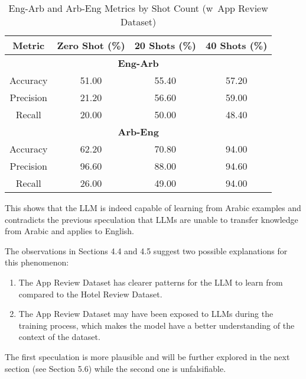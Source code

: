 \documentclass[sigconf, nonacm]{acmart}
\theoremstyle{definition}
\begin{document}
\begin{table}[h!]
  \centering
  \caption{Eng-Arb and Arb-Eng Metrics by Shot Count (w\ App Review Dataset)}
  \begin{tabular}{c c c c}
    \toprule
    \textbf{Metric} & \textbf{Zero Shot (\%)} & \textbf{20 Shots (\%)} & \textbf{40 Shots (\%)} \\
    \midrule
    \multicolumn{4}{c}{\textbf{Eng-Arb}}                                                        \\
    \midrule
    Accuracy        & 51.00                   & 55.40                  & 57.20                  \\
    Precision       & 21.20                   & 56.60                  & 59.00                  \\
    Recall          & 20.00                   & 50.00                  & 48.40                  \\
    \midrule
    \multicolumn{4}{c}{\textbf{Arb-Eng}}                                                        \\
    \midrule
    Accuracy        & 62.20                   & 70.80                  & 94.00                  \\
    Precision       & 96.60                   & 88.00                  & 94.60                  \\
    Recall          & 26.00                   & 49.00                  & 94.00                  \\
    \bottomrule
  \end{tabular}
\end{table}

This shows that the LLM is indeed capable of learning from Arabic examples and contradicts the previous speculation that LLMs are unable to transfer knowledge from Arabic and applies to English.

The observations in Sections 4.4 and 4.5 suggest two possible explanations for this phenomenon:
\begin{enumerate}
  \item The App Review Dataset has clearer patterns for the LLM to learn from compared to the Hotel Review Dataset.
  \item The App Review Dataset may have been exposed to LLMs during the training process, which makes the model have a better understanding of the context of the dataset.
\end{enumerate}

The first speculation is more plausible and will be further explored in the next section (see Section 5.6) while the second one is unfalsifiable.
\end{document}
